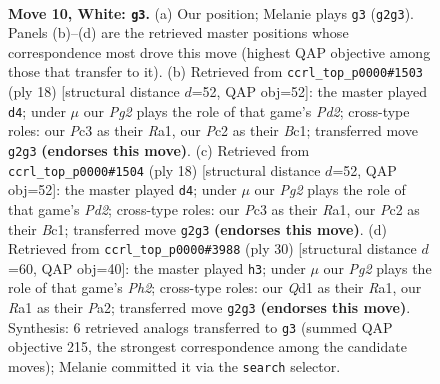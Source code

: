 \documentclass[11pt]{article}
\begin{document}
\clearpage

\begin{figure}[p]\centering
\begin{subfigure}{0.46\textwidth}\centering
\resizebox{\linewidth}{!}{%
\newchessgame
\chessboard[
  setfen={r1bq1rk1/p1p2pp1/2pp1n2/4p1Np/4P3/2PP4/P1P2PPP/R1BQ1RK1 w - - 0 10},
  showmover=false,
  pgfstyle=straightmove, color=movearrow, markmove={g2-g3}
]}
\caption{}
\end{subfigure}\hfill
\begin{subfigure}{0.46\textwidth}\centering
\resizebox{\linewidth}{!}{%
\newchessgame
\chessboard[
  setfen={r1bq1rk1/2p2ppp/p1pp1n2/4p3/4P3/2P2N1P/P1PP1PP1/R1BQR1K1 w - - 0 10},
  showmover=false,
  pgfstyle=straightmove, color=movearrow, markmove={d2-d4}
]}
\caption{}
\end{subfigure}
\\[4pt]
\begin{subfigure}{0.46\textwidth}\centering
\resizebox{\linewidth}{!}{%
\newchessgame
\chessboard[
  setfen={r1bq1rk1/2p2ppp/p1pp1n2/4p3/4P3/2P2N1P/P1PP1PP1/R1BQR1K1 w - - 0 10},
  showmover=false,
  pgfstyle=straightmove, color=movearrow, markmove={d2-d4}
]}
\caption{}
\end{subfigure}\hfill
\begin{subfigure}{0.46\textwidth}\centering
\resizebox{\linewidth}{!}{%
\newchessgame
\chessboard[
  setfen={2kr1b1r/ppnq4/2p1pp2/6p1/2PP3p/2N1B3/PPQ2PPP/R3R1K1 w - - 0 16},
  showmover=false,
  pgfstyle=straightmove, color=movearrow, markmove={h2-h3}
]}
\caption{}
\end{subfigure}
\caption{\textbf{Move 10, White: \texttt{g3}.} (a) Our position; Melanie plays \texttt{g3} (\texttt{g2g3}). Panels (b)--(d) are the retrieved master positions whose correspondence most drove this move (highest QAP objective among those that transfer to it). (b) Retrieved from \texttt{ccrl\_top\_p0000\#1503} (ply 18) [structural distance $d$=52, QAP obj=52]: the master played \texttt{d4}; under $\mu$ our \emph{Pg2} plays the role of that game's \emph{Pd2}; cross-type roles: our \emph{P}c3 as their \emph{R}a1, our \emph{P}c2 as their \emph{B}c1; transferred move \texttt{g2g3} \textbf{(endorses this move)}. (c) Retrieved from \texttt{ccrl\_top\_p0000\#1504} (ply 18) [structural distance $d$=52, QAP obj=52]: the master played \texttt{d4}; under $\mu$ our \emph{Pg2} plays the role of that game's \emph{Pd2}; cross-type roles: our \emph{P}c3 as their \emph{R}a1, our \emph{P}c2 as their \emph{B}c1; transferred move \texttt{g2g3} \textbf{(endorses this move)}. (d) Retrieved from \texttt{ccrl\_top\_p0000\#3988} (ply 30) [structural distance $d$=60, QAP obj=40]: the master played \texttt{h3}; under $\mu$ our \emph{Pg2} plays the role of that game's \emph{Ph2}; cross-type roles: our \emph{Q}d1 as their \emph{R}a1, our \emph{R}a1 as their \emph{P}a2; transferred move \texttt{g2g3} \textbf{(endorses this move)}. Synthesis: 6 retrieved analogs transferred to \texttt{g3} (summed QAP objective 215, the strongest correspondence among the candidate moves); Melanie committed it via the \texttt{search} selector.}
\label{fig:thought-m18}
\end{figure}
\end{document}
